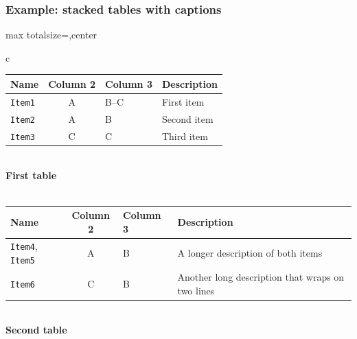 
\begin{frame}
    \frametitle{Example: stacked tables with captions}

    \begin{adjustbox}{max totalsize={\textwidth}{\textheight},center}
        \begin{tabular}{c}
            \begin{tabular}{l c l l}
                \toprule
                \textbf{\alert{Name}} & \textbf{\alert{Column 2}} & \textbf{\alert{Column 3}} & \textbf{\alert{Description}}\\
                \midrule
                \texttt{Item1} & A & B--C & First item\\
                \texttt{Item2} & A & B & Second item\\
                \texttt{Item3} & C & C & Third item\\
                \bottomrule
            \end{tabular}\\
            \textbf{First table}\\
            ~\\[1em]
            \begin{tabular}{p{} c l p{}}
                \toprule
                \textbf{\alert{Name}} & \textbf{\alert{Column 2}} & \textbf{\alert{Column 3}} & \textbf{\alert{Description}}\\
                \midrule
                \texttt{Item4}, \texttt{Item5} & A & B & A longer description of both items\\
                \texttt{Item6} & C & B & Another long description that wraps on two lines\\
                \bottomrule
            \end{tabular}\\
            \textbf{Second table}\\
        \end{tabular}
    \end{adjustbox}

\end{frame}

